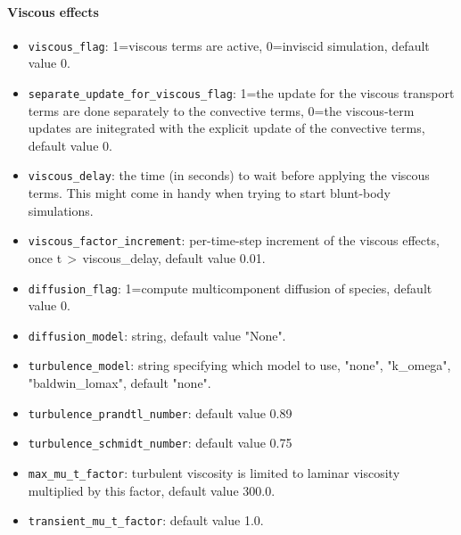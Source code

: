 \paragraph{Viscous effects}
\begin{itemize}
\item \texttt{viscous\_flag}: 1=viscous terms are active, 0=inviscid
  simulation, default value 0.
\item \texttt{separate\_update\_for\_viscous\_flag}\ddag: 1=the update 
  for the viscous transport terms are done separately to the convective terms,
  0=the viscous-term updates are initegrated with the explicit update of the convective terms,
  default value 0.
\item \texttt{viscous\_delay}: the time (in seconds) to wait before applying
  the viscous terms.
  This might come in handy when trying to start blunt-body simulations.
\item \texttt{viscous\_factor\_increment}: per-time-step increment of the viscous effects, once
  t\,$>$\,viscous\_delay, default value 0.01.
\item \texttt{diffusion\_flag}: 1=compute multicomponent diffusion of species, default value 0.
\item \texttt{diffusion\_model}: string, default value "None".
\item \texttt{turbulence\_model}: string specifying which model to use, "none", "k\_omega", "baldwin\_lomax",
  default "none".
\item \texttt{turbulence\_prandtl\_number}: default value 0.89
\item \texttt{turbulence\_schmidt\_number}: default value 0.75
\item \texttt{max\_mu\_t\_factor}: turbulent viscosity is limited to laminar viscosity multiplied
  by this factor, default value 300.0. 
\item \texttt{transient\_mu\_t\_factor}: default value 1.0.
\end{itemize}

